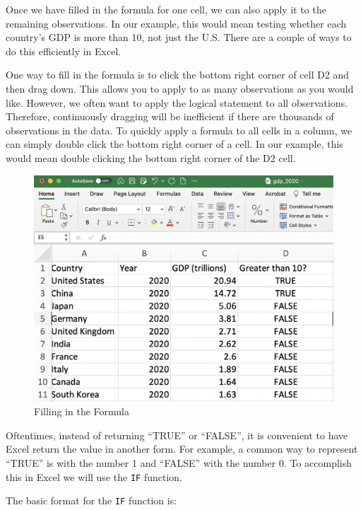 \documentclass[
]{book}
\begin{document}
Once we have filled in the formula for one cell, we can also apply it to the remaining observations. In our example, this would mean testing whether each country's GDP is more than 10, not just the U.S. There are a couple of ways to do this efficiently in Excel.

One way to fill in the formula is to click the bottom right corner of cell D2 and then drag down. This allows you to apply to as many observations as you would like. However, we often want to apply the logical statement to all observations. Therefore, continuously dragging will be inefficient if there are thousands of observations in the data. To quickly apply a formula to all cells in a column, we can simply double click the bottom right corner of a cell. In our example, this would mean double clicking the bottom right corner of the D2 cell.

\begin{figure}

{\centering \includegraphics[width=1\linewidth]{images/01_fill} 

}

\caption{Filling in the Formula}\label{fig:fill}
\end{figure}

Oftentimes, instead of returning ``TRUE'' or ``FALSE'', it is convenient to have Excel return the value in another form. For example, a common way to represent ``TRUE'' is with the number 1 and ``FALSE'' with the number 0. To accomplish this in Excel we will use the \texttt{IF} function.

The basic format for the \texttt{IF} function is:
\end{document}
